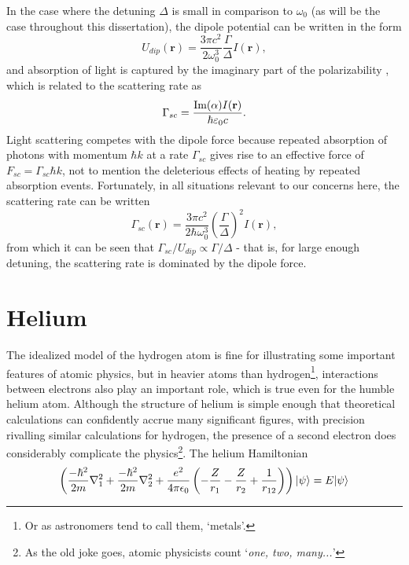	In the case where the detuning $\Delta$ is small in comparison to $\omega_0$ (as will be the case throughout this dissertation), the dipole potential can be written in the form \cite{Grimm00}
	\begin{equation}
		U_{dip}(\textbf{r}) = \frac{3\pi c^2}{2\omega_0^3}\frac{\Gamma}{\Delta}I(\textbf{r}),
	\end{equation}
	and absorption of light is captured by the imaginary part of the polarizability \cite{FootAtomic}, which is related to the scattering rate as
	\begin{equation}
		\Gamma_{sc} = \frac{\textrm{Im}(\alpha)I(\textbf{r})}{\hbar\varepsilon_0 c}.
	\end{equation}
	Light scattering competes with the dipole force because repeated absorption of photons with momentum $\hbar k$ at a rate $\Gamma_{sc}$ gives rise to an effective force of $F_{sc}=\Gamma_{sc}\hbar k$, not to mention the deleterious effects of heating by repeated absorption events.
	Fortunately, in all situations relevant to our concerns here, the scattering rate can be written 
	\begin{equation}
		\Gamma_{sc}(\textbf{r}) = \frac{3\pi c^2}{2\hbar\omega_0^3}\left(\frac{\Gamma}{\Delta}\right)^2 I(\textbf{r}),
	\end{equation}
	from which it can be seen that $\Gamma_{sc}/U_{dip} \propto \Gamma/\Delta$ - that is, for large enough detuning, the scattering rate is dominated by the dipole force.
	

		
\section{Helium} 

	The idealized model of the hydrogen atom is fine for illustrating some important features of atomic physics, but in heavier atoms than hydrogen\footnote{Or as astronomers tend to call them, `metals'.}, interactions between electrons also play an important role, which is true even for the humble helium atom.
	Although the structure of helium is simple enough that theoretical calculations can confidently accrue many significant figures, with precision rivalling similar calculations for hydrogen, the presence of a second electron does considerably complicate the physics\footnote{As the old joke goes, atomic physicists count `\emph{one, two, many...}'}.
	The helium Hamiltonian 
	$$
	\left(\frac{-\hbar^2}{2m}\nabla_{1}^2+\frac{-\hbar^2}{2m}\nabla_{2}^2 + \frac{e^2}{4\pi\epsilon_0}\left(-\frac{Z}{r_1}-\frac{Z}{r_2}+\frac{1}{r_{12}}\right) \right)|\psi\rangle = E |\psi\rangle
	$$

